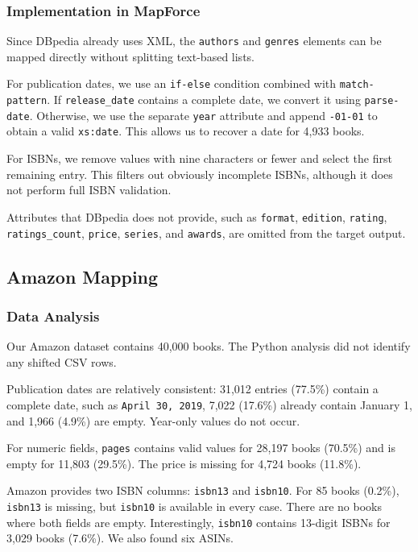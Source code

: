 \documentclass[runningheads]{llncs}
\begin{document}
\subsubsection{Implementation in MapForce}

Since DBpedia already uses XML, the \texttt{authors}
and \texttt{genres} elements can be mapped directly
without splitting text-based lists.

For publication dates, we use an \texttt{if-else}
condition combined with \texttt{match-pattern}.
If \texttt{release\_date} contains a complete date,
we convert it using \texttt{parse-date}. Otherwise,
we use the separate \texttt{year} attribute and append
\texttt{-01-01} to obtain a valid \texttt{xs:date}.
This allows us to recover a date for 4,933 books.

For ISBNs, we remove values with nine characters or
fewer and select the first remaining entry. This
filters out obviously incomplete ISBNs, although
it does not perform full ISBN validation.

Attributes that DBpedia does not provide, such as
\texttt{format}, \texttt{edition}, \texttt{rating},
\texttt{ratings\_count}, \texttt{price},
\texttt{series}, and \texttt{awards}, are omitted
from the target output.


\subsection{Amazon Mapping}

\subsubsection{Data Analysis}

Our Amazon dataset contains 40,000 books. The Python
analysis did not identify any shifted CSV rows.

Publication dates are relatively consistent:
31,012 entries (77.5\%) contain a complete date,
such as \texttt{April 30, 2019}, 7,022 (17.6\%)
already contain January 1, and 1,966 (4.9\%) are
empty. Year-only values do not occur.

For numeric fields, \texttt{pages} contains valid
values for 28,197 books (70.5\%) and is empty
for 11,803 (29.5\%). The price is missing for
4,724 books (11.8\%).

Amazon provides two ISBN columns:
\texttt{isbn13} and \texttt{isbn10}. For 85 books
(0.2\%), \texttt{isbn13} is missing, but
\texttt{isbn10} is available in every case.
There are no books where both fields are empty.
Interestingly, \texttt{isbn10} contains 13-digit
ISBNs for 3,029 books (7.6\%). We also found
six ASINs.
\end{document}
